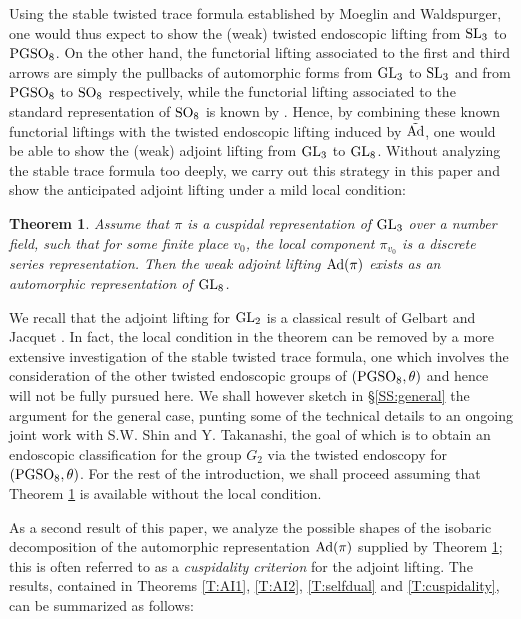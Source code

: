 \documentclass[11pt]{amsart}
\theoremstyle{plain}
\newtheorem{thm}[equation]{Theorem}
\numberwithin{equation}{section}
\def\SL{{\rm SL}}
\def\PGSO{{\rm PGSO}}
\def\GL{{\rm GL}}
\def\SO{{\rm SO}}
\begin{document}
 Using the stable twisted trace formula established by  Moeglin and Waldspurger, one would thus expect to show the 
 (weak) twisted endoscopic lifting from  $\SL_3$ to $\PGSO_8$.  On the other hand,  the functorial lifting associated to the first and third arrows are simply the pullbacks of automorphic forms from $\GL_3$ to $\SL_3$ and from $\PGSO_8$ to $\SO_8$ respectively, while  the functorial lifting associated to the standard representation of $\SO_8$ is known  by \cite{A, CKPSS}. Hence, by combining these known functorial liftings with the twisted endoscopic lifting induced by $\tilde{{\rm Ad}}$, one would be able to show the (weak) adjoint lifting from $\GL_3$ to $\GL_8$.   Without analyzing the stable trace formula too deeply, we carry out this strategy in this paper and  show  the anticipated adjoint lifting under a mild local  condition:
\vskip 5pt

\begin{thm}  \label{T:intro2}
Assume that $\pi$ is a cuspidal representation of $\GL_3$ over a number field, such that for some finite place $v_0$, the local component $\pi_{v_0}$ is a discrete series representation.  Then the weak adjoint lifting ${\rm Ad}(\pi)$ exists as an automorphic representation of $\GL_8$. 
\end{thm}
\vskip 10pt

 We recall that the adjoint lifting for $\GL_2$ is a classical result of Gelbart and Jacquet \cite{GJ}.
In fact, the local condition in the theorem can be removed by a more extensive investigation of the stable twisted trace formula, one which involves the consideration of the other twisted endoscopic groups of $(\PGSO_8, \theta)$  and hence will not be fully pursued  here.
 We shall however sketch  in \S \ref{SS:general} the argument for  the general case, punting some of the technical details  to 
 an  ongoing joint work  with S.W. Shin and Y. Takanashi,  the goal of which is to obtain an endoscopic classification for the group $G_2$ via the twisted endoscopy for $(\PGSO_8, \theta)$.   For the rest of the introduction, we shall proceed assuming that  Theorem \ref{T:intro2} is available without the local condition. 
\vskip 5pt

As a second result of this paper, we analyze the possible shapes of the isobaric decomposition of the automorphic representation ${\rm Ad}(\pi)$ supplied by Theorem \ref{T:intro2}; this is often referred to as a {\it cuspidality criterion} for the adjoint lifting. The results, contained in Theorems \ref{T:AI1}, \ref{T:AI2}, \ref{T:selfdual} and \ref{T:cuspidality}, can be summarized as follows:
\vskip 5pt
\end{document}
